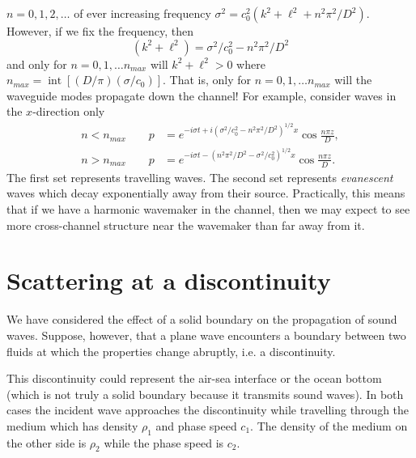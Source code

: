 \sourcepagebreak

$n=0,1,2,\ldots$ of ever increasing frequency
$\sigma^2=c_0^2(k^2+\ell^2+n^2\pi^2/D^2)$. However, if we fix the frequency, then
\[
	(k^2+\ell^2)=\sigma^2/c_0^2-n^2\pi^2/D^2
\]
and only for $n=0,1,\ldots n_{max}$ will $k^2+\ell^2>0$ where
$n_{max}=\operatorname{int}[(D/\pi)(\sigma/c_0)]$. That is, only for
$n=0,1,\ldots n_{max}$ will the waveguide modes propagate down the channel! For
example, consider waves in the $x$-direction only
\begin{align*}
	n<n_{max}\qquad
	p & =e^{-i\sigma t+i(\sigma^2/c_0^2-n^2\pi^2/D^2)^{1/2}x}
	\cos\frac{n\pi z}{D},                                     \\
	n>n_{max}\qquad
	p & =e^{-i\sigma t-(n^2\pi^2/D^2-\sigma^2/c_0^2)^{1/2}x}
	\cos\frac{n\pi z}{D}.
\end{align*}
The first set represents travelling waves. The second set represents \emph{evanescent} waves
which decay exponentially away from their source. Practically, this means that if we
have a harmonic wavemaker in the channel, then we may expect to see more
cross-channel structure near the wavemaker than far away from it.

\section{Scattering at a discontinuity}

We have considered the effect of a solid boundary on the propagation of sound waves.
Suppose, however, that a plane wave encounters a boundary between two fluids at which
the properties change abruptly, i.e. a discontinuity.



This discontinuity could represent the air-sea interface or the ocean bottom (which is
not truly a solid boundary because it transmits sound waves). In both cases the
incident wave approaches the discontinuity while travelling through the medium which
has density $\rho_1$ and phase speed $c_1$. The density of the medium on the other side is $\rho_2$
while the phase speed is $c_2$.

